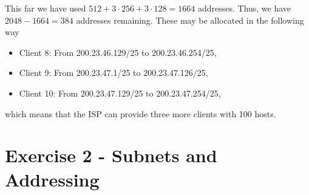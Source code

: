 \documentclass[10pt]{article}
\begin{document}
\begin{enumerate}[a)]
This far we have used $512+3\cdot256+3\cdot128=1664$ addresses. Thus, we have $2048-1664=384$ addresses remaining. These may be allocated in the following way
        \begin{itemize}
            \item Client 8: From 200.23.46.129/25 to 200.23.46.254/25,
            \item Client 9: From 200.23.47.1/25 to 200.23.47.126/25,
            \item Client 10: From 200.23.47.129/25 to 200.23.47.254/25,
        \end{itemize}
which means that the ISP can provide three more clients with 100 hosts.
\end{enumerate}
\section{Exercise 2 - Subnets and Addressing}
\end{document}
